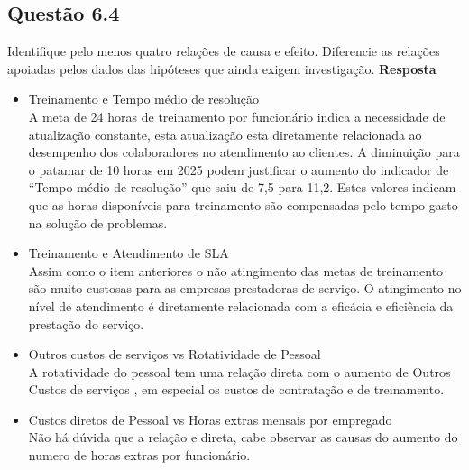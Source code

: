 \subsection{Questão 6.4}
Identifique pelo menos quatro relações de causa e efeito. Diferencie as relações apoiadas pelos dados das hipóteses que ainda exigem investigação.
\textbf{Resposta}\\
\begin{itemize}
\item Treinamento e Tempo médio de resolução\\
  A meta de 24 horas de treinamento por funcionário indica a necessidade de atualização constante, esta atualização esta diretamente relacionada ao desempenho dos colaboradores no atendimento ao clientes. A diminuição para o patamar de 10 horas em 2025 podem justificar o aumento do indicador de ``Tempo médio de resolução'' que saiu de 7,5 para 11,2. Estes valores indicam que as horas disponíveis para treinamento são compensadas pelo tempo gasto na solução de problemas.\\
\item Treinamento e Atendimento de SLA\\
  Assim como o item anteriores o não atingimento das metas de treinamento são muito custosas para as empresas prestadoras de serviço. O atingimento no nível de atendimento é diretamente relacionada com a eficácia e eficiência da prestação do serviço.\\
\item Outros custos de serviços vs Rotatividade de Pessoal\\
  A rotatividade do pessoal tem uma relação direta com o aumento de Outros Custos de serviços , em especial os custos de contratação e de treinamento.\\
\item Custos diretos de Pessoal vs Horas extras mensais por empregado\\
Não há dúvida que a relação e direta, cabe observar as causas do aumento do numero de horas extras por funcionário. \\
\end{itemize}
